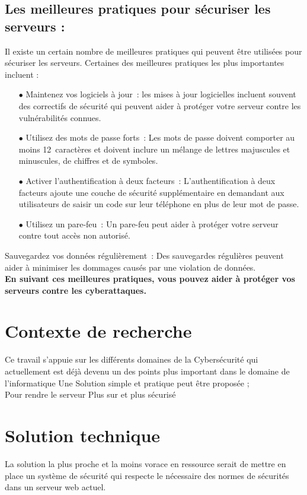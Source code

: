  \subsection{Les meilleures pratiques pour sécuriser les serveurs :}
Il existe un certain nombre de meilleures pratiques qui peuvent être utilisées pour sécuriser les serveurs. Certaines des meilleures pratiques les plus importantes incluent :\\
\begin{itemize}
\item[$\bullet$] Maintenez vos logiciels à jour :   les mises à jour logicielles incluent souvent des correctifs de sécurité qui peuvent aider à protéger votre serveur contre les vulnérabilités connues.
\item[$\bullet$]Utilisez des mots de passe forts :  Les mots de passe doivent comporter au moins 12 caractères et doivent inclure un mélange de lettres majuscules et minuscules, de chiffres et de symboles.
\item[$\bullet$]Activer l'authentification à deux facteurs :  L'authentification à deux facteurs ajoute une couche de sécurité supplémentaire en demandant aux utilisateurs de saisir un code sur leur téléphone en plus de leur mot de passe.
\item[$\bullet$]Utilisez un pare-feu :  Un pare-feu peut aider à protéger votre serveur contre tout accès non autorisé.
\end{itemize}
 Sauvegardez vos données régulièrement :  Des sauvegardes régulières peuvent aider à minimiser les dommages causés par une violation de données.\\
 \textbf{	En suivant ces meilleures pratiques, vous pouvez aider à protéger vos serveurs contre les cyberattaques.}
   \section{Contexte de recherche}
    Ce travail s'appuie sur les différents domaines   de la  Cybersécurité qui actuellement est déjà devenu un  des points  plus   important dans le domaine de l'informatique 
   Une Solution simple et pratique peut être proposée ;\\
   Pour rendre le serveur Plus sur et plus sécurisé
   \section{Solution technique} 
   La solution la plus proche et la moins vorace en ressource serait de mettre en place un système de sécurité qui respecte le nécessaire des normes de sécurités dans un serveur web actuel.
